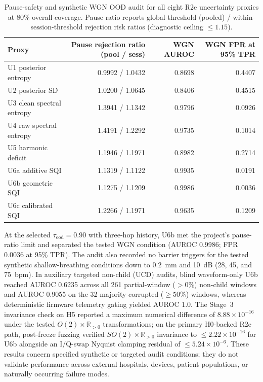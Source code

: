 \begin{table}[htbp]
\centering
\footnotesize
\caption{Pause-safety and synthetic WGN OOD audit for all eight R2e uncertainty proxies at 80\% overall coverage. Pause ratio reports global-threshold (pooled) / within-session-threshold rejection risk ratios (diagnostic ceiling $\le 1.15$).}
\label{tab:ch5_pause_ood}
\begin{tabularx}{\textwidth}{@{}>{\raggedright\arraybackslash}Xrrr@{}}
\toprule
Proxy & Pause rejection ratio (pool / sess) & WGN AUROC & WGN FPR at 95\% TPR \\
\midrule
U1 posterior entropy & 0.9992 / 1.0432 & 0.8698 & 0.4407 \\
U2 posterior SD & 1.0200 / 1.0645 & 0.8406 & 0.4515 \\
U3 clean spectral entropy & 1.3941 / 1.1342 & 0.9796 & 0.0926 \\
U4 raw spectral entropy & 1.4191 / 1.2292 & 0.9735 & 0.1014 \\
U5 harmonic deficit & 1.1946 / 1.1971 & 0.8982 & 0.2714 \\
U6a additive SQI & 1.1319 / 1.1122 & 0.9935 & 0.0191 \\
U6b geometric SQI & 1.1275 / 1.1209 & 0.9986 & 0.0036 \\
U6c calibrated SQI & 1.2266 / 1.1971 & 0.9635 & 0.1209 \\
\bottomrule
\end{tabularx}
\end{table}

At the selected $\tau_{\mathrm{ood}}=0.90$ with three-hop history, U6b met the project's pause-ratio limit and separated the tested WGN condition (AUROC 0.9986; FPR 0.0036 at 95\% TPR). The audit also recorded no barrier triggers for the tested synthetic shallow-breathing conditions down to 0.2~mm and 10~dB (28, 45, and 75~bpm). In auxiliary targeted non-child (UCD) audits, blind waveform-only U6b reached AUROC 0.6235 across all 261 partial-window ($>0\%$) non-child windows and AUROC 0.9055 on the 32 majority-corrupted ($\ge 50\%$) windows, whereas deterministic firmware telemetry gating yielded AUROC 1.0. The Stage~3 invariance check on H5 reported a maximum numerical difference of $8.88\times10^{-16}$ under the tested $O(2)\times\mathbb{R}_{>0}$ transformations; on the primary H0-backed R2e path, post-freeze fuzzing verified $SO(2)\times\mathbb{R}_{>0}$ invariance to $\le 2.22\times10^{-16}$ for U6b alongside an I/Q-swap Nyquist clamping residual of $\le 5.24\times10^{-6}$. These results concern specified synthetic or targeted audit conditions; they do not validate performance across external hospitals, devices, patient populations, or naturally occurring failure modes.

